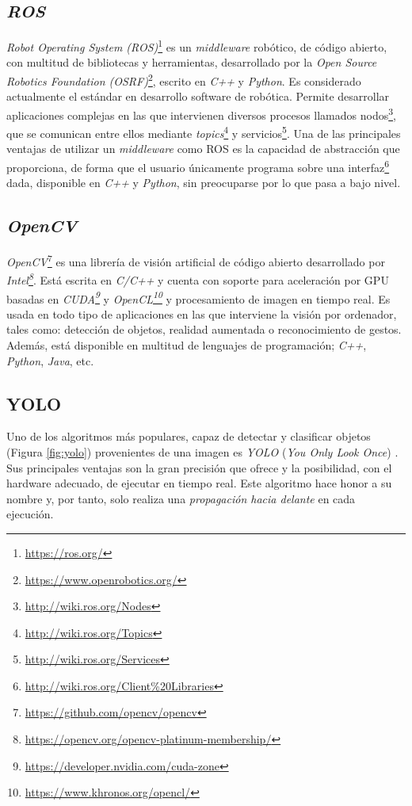 \subsection{\textit{ROS}}
\label{subsection:ros}
\textit{Robot Operating System (ROS)}\footnote{\url{https://ros.org/}} es un \textit{middleware} robótico, de código abierto, con multitud de bibliotecas y herramientas, desarrollado por la \textit{Open Source Robotics Foundation (OSRF)}\footnote{\url{https://www.openrobotics.org/}}, escrito en \textit{C++} y \textit{Python}. Es considerado actualmente el estándar en desarrollo software de robótica. Permite desarrollar aplicaciones complejas en las que intervienen diversos procesos llamados nodos\footnote{\url{http://wiki.ros.org/Nodes}}, que se comunican entre ellos mediante \textit{topics}\footnote{\url{http://wiki.ros.org/Topics}} y servicios\footnote{\url{http://wiki.ros.org/Services}}. Una de las principales ventajas de utilizar un \textit{middleware} como ROS es la capacidad de abstracción que proporciona, de forma que el usuario únicamente programa sobre una interfaz\footnote{\url{http://wiki.ros.org/Client\%20Libraries}} dada, disponible en \textit{C++} y \textit{Python}, sin preocuparse por lo que pasa a bajo nivel.\\

\subsection{\textit{OpenCV}}
\label{subsection:opencv}
\textit{OpenCV}\footnote{\url{https://github.com/opencv/opencv}} es una librería de visión artificial de código abierto desarrollado por \textit{Intel\footnote{\url{https://opencv.org/opencv-platinum-membership/}}}. Está escrita en \textit{C/C++} y cuenta con soporte para aceleración por GPU basadas en \textit{CUDA\footnote{\url{https://developer.nvidia.com/cuda-zone}}} y \textit{OpenCL\footnote{\url{https://www.khronos.org/opencl/}}} y procesamiento de imagen en tiempo real. Es usada en todo tipo de aplicaciones en las que interviene la visión por ordenador, tales como: detección de objetos, realidad aumentada o reconocimiento de gestos. Además, está disponible en multitud de lenguajes de programación; \textit{C++}, \textit{Python}, \textit{Java}, etc.\\

\subsection{YOLO}
\label{sec:yolo}
Uno de los algoritmos más populares, capaz de detectar y clasificar objetos (Figura \ref{fig:yolo}) provenientes de una imagen es \textit{YOLO} (\textit{You Only Look Once}) \cite{yolov3}. Sus principales ventajas son la gran precisión que ofrece y la posibilidad, con el hardware adecuado, de ejecutar en tiempo real. Este algoritmo hace honor a su nombre y, por tanto, solo realiza una \textit{propagación hacia delante} en cada ejecución.\\

